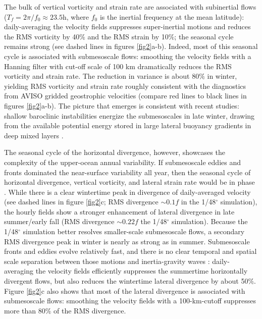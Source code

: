 \documentclass[grl]{agutex2015}
\begin{document}
\begin{article}
The bulk of vertical vorticity and strain rate are associated with subinertial flows
($T_f = 2\pi/f_0\approx 23.5$h, where $f_0$ is the inertial frequency at
the mean latitude): daily-averaging the velocity fields suppresses super-inertial
motions and reduces the RMS
vorticity by 40$\%$ and the RMS strain by 10$\%$; the seasonal
cycle remains strong (see
dashed lines in figures \ref{fig2}a-b). Indeed, most of this seasonal cycle is associated
with submesoscale flows: smoothing the velocity fields
with a Hanning filter with cut-off scale of 100 km dramatically reduces the RMS
vorticity and strain rate. The reduction in variance is about 80$\%$ in winter,
yielding RMS vorticity and strain  rate roughly consistent with the diagnostics from
AVISO gridded geostrophic velocities (compare red lines to black lines in figures \ref{fig2}a-b).
The picture that emerges is consistent with recent studies: shallow baroclinic
instabilities energize the submesoscales in late winter, drawing from the available
potential energy stored in large lateral buoyancy gradients in deep mixed layers \citep{sasaki_etal2014,callies_etal2015,callies_etal2016}.

The seasonal cycle of the horizontal divergence, however, showcases the complexity
of the upper-ocean annual variability. If submesoscale eddies and fronts dominated
the near-surface variability all year, then the seasonal cycle of horizontal divergence,
vertical vorticity, and lateral strain rate would be in phase \citep[e.g.,][]{sasaki_etal2014}.
While there is a clear wintertime peak in divergence of daily-averaged velocity
(see dashed lines in figure \ref{fig2}c; RMS divergence $\sim0.1 f$ in the 1/48$^\circ$
simulation), the hourly fields show
a stronger enhancement of
lateral divergence in late summer/early fall (RMS divergence $\sim0.22 f$ the 1/48$^\circ$
simulation). Because the 1/48$^\circ$ simulation better resolves
smaller-scale submesoscale flows, a secondary RMS divergence peak in winter  is
nearly as strong as in summer. Submesoscale fronts and eddies evolve
relatively fast, and there is no clear
temporal and spatial scale separation between those motions and inertia-gravity waves
\citep{mcwilliams2016}:
daily-averaging the velocity fields efficiently suppresses the summertime horizontally
divergent flows, but also reduces the wintertime lateral divergence by about 50$\%$.
Figure \ref{fig2}c also shows that most of the lateral divergence is associated
with submesoscale flows: smoothing the velocity fields with a 100-km-cutoff
suppresses more than 80$\%$ of the RMS divergence.



\end{article}
\end{document}
